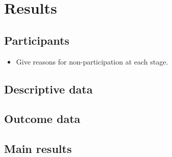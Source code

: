 \documentclass[
  letterpaper,
  DIV=11,
  numbers=noendperiod]{scrartcl}
\providecommand{\tightlist}{%
  \setlength{\itemsep}{0pt}\setlength{\parskip}{0pt}}\usepackage{longtable,booktabs,array}
\begin{document}
\hypertarget{sec-res}{%
\section{Results}\label{sec-res}}

\hypertarget{sec-res-participants}{%
\subsection{Participants}\label{sec-res-participants}}

\begin{itemize}
\tightlist
\item
  Give reasons for non-participation at each stage.
\end{itemize}

\hypertarget{sec-res-pop-desc}{%
\subsection{Descriptive data}\label{sec-res-pop-desc}}

\hypertarget{sec-res-out-desc}{%
\subsection{Outcome data}\label{sec-res-out-desc}}

\hypertarget{sec-res-main}{%
\subsection{Main results}\label{sec-res-main}}
\end{document}
